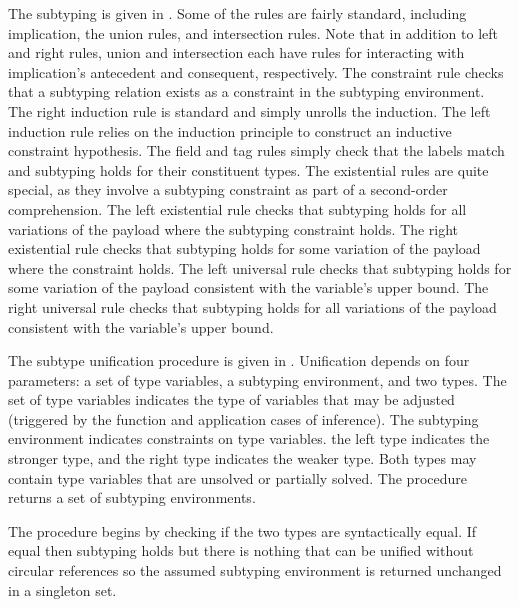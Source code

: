 \documentclass[acmsmall]{acmart}
\theoremstyle{definition}
\begin{document}
The subtyping is given in .
Some of the rules are fairly standard, including implication, the union rules, and intersection rules.
Note that in addition to left and right rules, union and intersection each have rules for 
interacting with implication's antecedent and consequent, respectively.
The constraint rule checks that a subtyping relation exists as a constraint in the subtyping environment.
The right induction rule is standard and simply unrolls the induction.
The left induction rule relies on the induction principle to construct an 
inductive constraint hypothesis.  
The field and tag rules simply check that the labels match and subtyping holds for their constituent types.
The existential rules are quite special, as they involve a subtyping constraint as part of 
a second-order comprehension. 
The left existential rule checks that subtyping holds for all variations of the payload 
where the subtyping constraint holds. 
The right existential rule checks that subtyping holds for some variation of the payload where the constraint holds.
The left universal rule checks that subtyping holds for some variation of the payload consistent with
the variable's upper bound. 
The right universal rule checks that subtyping holds for all variations of the payload consistent with
the variable's upper bound.

The subtype unification procedure is given in .
Unification depends on four parameters: a set of type variables, a subtyping environment, and two types.
The set of type variables indicates the type of variables that may be adjusted 
(triggered by the function and application cases of inference). 
The subtyping environment indicates constraints on type variables.
the left type indicates the stronger type, and the right type indicates the weaker type.
Both types may contain type variables that are unsolved or partially solved.
The procedure returns a set of subtyping environments.

The procedure begins by checking if the two types are syntactically equal.
If equal then subtyping holds but there is nothing that can be unified 
without circular references so the assumed subtyping environment is returned 
unchanged in a singleton set. 
\end{document}
